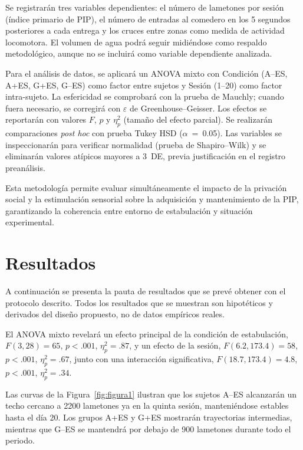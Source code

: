 \documentclass[12pt,a4paper]{article}
\begin{document}
\begin{multicols}{2}
Se registrarán tres variables dependientes: el número de lametones por sesión (índice primario de PIP), el número de entradas al comedero en los 5 segundos posteriores a cada entrega y los cruces entre zonas como medida de actividad locomotora. El volumen de agua podrá seguir midiéndose como respaldo metodológico, aunque no se incluirá como variable dependiente analizada.

Para el análisis de datos, se aplicará un ANOVA mixto con Condición (A--ES, A+ES, G+ES, G--ES) como factor entre sujetos y Sesión (1–20) como factor intra-sujeto. La esfericidad se comprobará con la prueba de Mauchly; cuando fuera necesario, se corregirá con $\varepsilon$ de Greenhouse–Geisser. Los efectos se reportarán con valores $F$, $p$ y $\eta^2_p$ (tamaño del efecto parcial). Se realizarán comparaciones \textit{post hoc} con prueba Tukey HSD ($\alpha$~=~0.05). Las variables se inspeccionarán para verificar normalidad (prueba de Shapiro–Wilk) y se eliminarán valores atípicos mayores a $3$~DE, previa justificación en el registro preanálisis.


\vspace{2mm}
Esta metodología permite evaluar simultáneamente el impacto de la privación social y la estimulación sensorial sobre la adquisición y mantenimiento de la PIP, garantizando la coherencia entre entorno de estabulación y situación experimental.


\section{Resultados}

A continuación se presenta la pauta de resultados que se prevé obtener con el protocolo descrito. Todos los resultados que se muestran son hipotéticos y derivados del diseño propuesto, no de datos empíricos reales. 

El ANOVA mixto revelará un efecto principal de la condición de estabulación, $F(3, 28) = 65$, $p < .001$, $\eta^2_p = .87$, y un efecto de la sesión, $F(6.2, 173.4) = 58$, $p < .001$, $\eta^2_p = .67$, junto con una interacción significativa, $F(18.7, 173.4) = 4.8$, $p < .001$, $\eta^2_p = .34$.

Las curvas de la Figura~\ref{fig:figura1} ilustran que los sujetos A--ES alcanzarán un techo cercano a 2200 lametones ya en la quinta sesión, manteniéndose estables hasta el día 20. Los grupos A+ES y G+ES mostrarán trayectorias intermedias, mientras que G--ES se mantendrá por debajo de 900 lametones durante todo el periodo.


\end{multicols}
\end{document}
